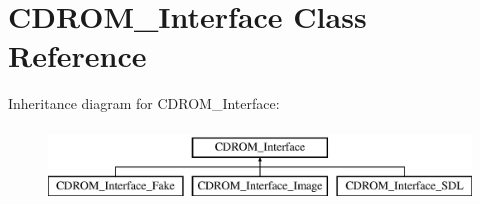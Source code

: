\hypertarget{classCDROM__Interface}{\section{C\-D\-R\-O\-M\-\_\-\-Interface Class Reference}
\label{classCDROM__Interface}
}
Inheritance diagram for C\-D\-R\-O\-M\-\_\-\-Interface\-:\begin{figure}[H]
\begin{center}
\leavevmode
\includegraphics[height=2.000000cm]{classCDROM__Interface}
\end{center}
\end{figure}
